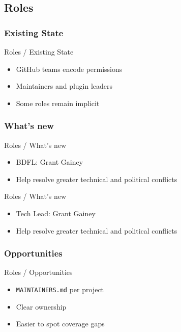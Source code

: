 \documentclass[aspectratio=169]{beamer}
\begin{document}
\subsection{Roles}
\subsubsection{Existing State}
\begin{frame}{Roles / Existing State}
  \Large
  \begin{itemize}
    \setlength{\itemsep}{1em}
    \item GitHub teams encode permissions
    \item Maintainers and plugin leaders
    \item Some roles remain implicit
  \end{itemize}
\end{frame}

\subsubsection{What's new}
\begin{frame}{Roles / What's new}
  \begin{itemize}
    \setlength{\itemsep}{1em}
    \item BDFL: Grant Gainey
    \item Help resolve greater technical and political conflicts
  \end{itemize}
\end{frame}

\begin{frame}{Roles / What's new}
  \begin{itemize}
    \setlength{\itemsep}{1em}
    \item Tech Lead: Grant Gainey
    \item Help resolve greater technical and political conflicts
  \end{itemize}
\end{frame}

\subsubsection{Opportunities}
\begin{frame}{Roles / Opportunities}
  \Large
  \begin{itemize}
    \setlength{\itemsep}{1em}
    \item \texttt{MAINTAINERS.md} per project
    \item Clear ownership
    \item Easier to spot coverage gaps
  \end{itemize}
\end{frame}
\end{document}
